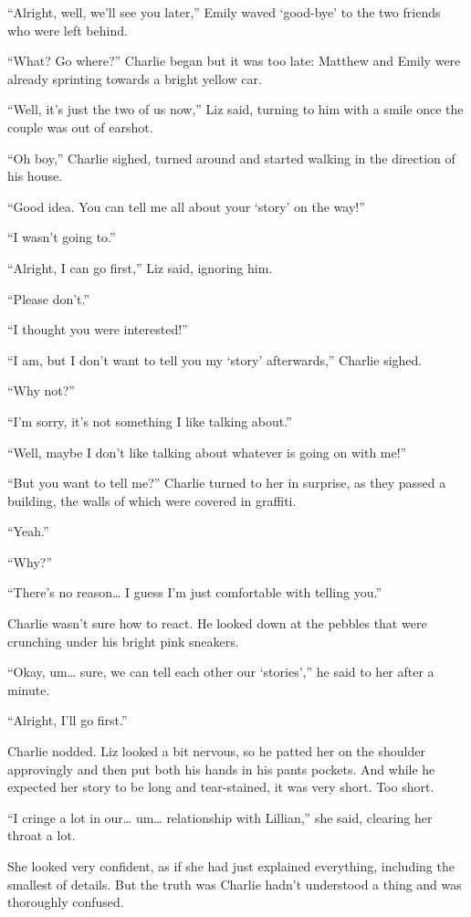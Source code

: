 “Alright, well, we’ll see you later,” Emily waved ‘good-bye’ to the two friends who were left behind.

“What? Go where?” Charlie began but it was too late: Matthew and Emily were already sprinting towards a bright yellow car.

“Well, it’s just the two of us now,” Liz said, turning to him with a smile once the couple was out of earshot.

“Oh boy,” Charlie sighed, turned around and started walking in the direction of his house.

“Good idea. You can tell me all about your ‘story’ on the way!”

“I wasn’t going to.”

“Alright, I can go first,” Liz said, ignoring him.

“Please don’t.”

“I thought you were interested!”

“I am, but I don’t want to tell you my ‘story’ afterwards,” Charlie sighed.

“Why not?”

“I’m sorry, it’s not something I like talking about.”

“Well, maybe I don’t like talking about whatever is going on with me!”

“But you want to tell me?” Charlie turned to her in surprise, as they passed a building, the walls of which were covered in graffiti.

“Yeah.”

“Why?”

“There’s no reason… I guess I’m just comfortable with telling you.”

Charlie wasn’t sure how to react. He looked down at the pebbles that were crunching under his bright pink sneakers.

“Okay, um… sure, we can tell each other our ‘stories’,” he said to her after a minute.

“Alright, I’ll go first.”

 Charlie nodded. Liz looked a bit nervous, so he patted her on the shoulder approvingly and then put both his hands in his pants pockets. And while he expected her story to be long and tear-stained, it was very short. Too short.

“I cringe a lot in our… um… relationship with Lillian,” she said, clearing her throat a lot.

She looked very confident, as if she had just explained everything, including the smallest of details. But the truth was Charlie hadn’t understood a thing and was thoroughly confused.

